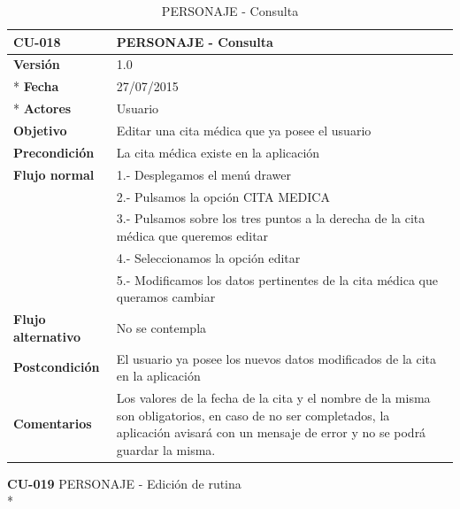 \documentclass[../pfc.tex]{subfiles}
\begin{document}
		\begin{table}[H]
			\centering
			\begin{tabular}[t]{|p{3cm}|p{9.5cm}|}
				\hline \textbf{CU-018} & \textbf{PERSONAJE - Consulta} \\*
				\hline\hline \textbf{Versión} & 1.0 \\ *
				\hline\hline \textbf{Fecha} & 27/07/2015 \\ *
				\hline\textbf{Actores} 	& Usuario\\*
				\hline \textbf{Objetivo} & Editar una cita médica que ya posee el usuario\\* 			
				\hline \textbf{Precondición} & La cita médica existe en la aplicación\\* 
				\hline \textbf{Flujo normal} & 1.- Desplegamos el menú drawer \\* 
				& 2.- Pulsamos la opción CITA MEDICA\\*	
				& 3.- Pulsamos sobre los tres puntos a la derecha de la cita médica que queremos editar\\*	
				& 4.- Seleccionamos la opción editar\\*	
				& 5.- Modificamos los datos pertinentes de la cita médica que queramos cambiar\\*	
				\hline \textbf{Flujo alternativo} & No se contempla \\* 
				\hline \textbf{Postcondición} & El usuario ya posee los nuevos datos modificados de la cita en la aplicación \\* 
				\hline \textbf{Comentarios}   & Los valores de la fecha de la cita y el nombre de la misma son obligatorios, en caso de no ser completados, la aplicación avisará con un mensaje de error y no se podrá guardar la misma.\\*
				\hline
			\end{tabular}
			\caption{PERSONAJE - Consulta}
			\label{tabla:caso018}
		\end{table}
		
		
		
		
		\textbf{CU-019}	PERSONAJE - Edición de rutina\\*
		
\end{document}
